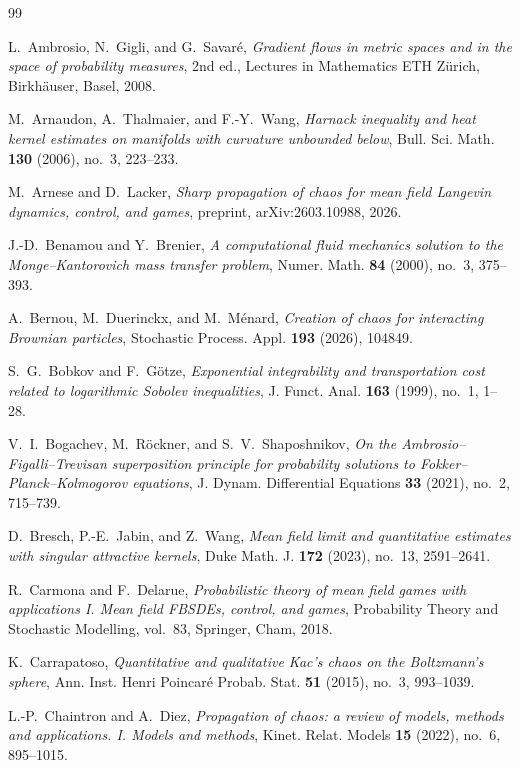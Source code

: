 \documentclass[11pt]{amsart}
\numberwithin{equation}{section}
\theoremstyle{plain}
\theoremstyle{remark}
\begin{document}
\begin{thebibliography}{99}

L.~Ambrosio, N.~Gigli, and G.~Savar\'e, \emph{Gradient flows in metric spaces and in the space of probability measures}, 2nd ed., Lectures in Mathematics ETH Z\"urich, Birkh\"auser, Basel, 2008.

M.~Arnaudon, A.~Thalmaier, and F.-Y.~Wang, \emph{Harnack inequality and heat kernel estimates on manifolds with curvature unbounded below}, Bull. Sci. Math. \textbf{130} (2006), no.~3, 223--233.

M.~Arnese and D.~Lacker, \emph{Sharp propagation of chaos for mean field Langevin dynamics, control, and games}, preprint, arXiv:2603.10988, 2026.

J.-D.~Benamou and Y.~Brenier, \emph{A computational fluid mechanics solution to the Monge--Kantorovich mass transfer problem}, Numer. Math. \textbf{84} (2000), no.~3, 375--393.

A.~Bernou, M.~Duerinckx, and M.~M\'enard, \emph{Creation of chaos for interacting Brownian particles}, Stochastic Process. Appl. \textbf{193} (2026), 104849.

S.~G.~Bobkov and F.~G\"otze, \emph{Exponential integrability and transportation cost related to logarithmic Sobolev inequalities}, J. Funct. Anal. \textbf{163} (1999), no.~1, 1--28.

V.~I.~Bogachev, M.~R\"ockner, and S.~V.~Shaposhnikov, \emph{On the Ambrosio--Figalli--Trevisan superposition principle for probability solutions to Fokker--Planck--Kolmogorov equations}, J. Dynam. Differential Equations \textbf{33} (2021), no.~2, 715--739.

D.~Bresch, P.-E.~Jabin, and Z.~Wang, \emph{Mean field limit and quantitative estimates with singular attractive kernels}, Duke Math. J. \textbf{172} (2023), no.~13, 2591--2641.

R.~Carmona and F.~Delarue, \emph{Probabilistic theory of mean field games with applications I. Mean field FBSDEs, control, and games}, Probability Theory and Stochastic Modelling, vol.~83, Springer, Cham, 2018.

K.~Carrapatoso, \emph{Quantitative and qualitative Kac's chaos on the Boltzmann's sphere}, Ann. Inst. Henri Poincar\'e Probab. Stat. \textbf{51} (2015), no.~3, 993--1039.

L.-P.~Chaintron and A.~Diez, \emph{Propagation of chaos: a review of models, methods and applications. I. Models and methods}, Kinet. Relat. Models \textbf{15} (2022), no.~6, 895--1015.


\end{thebibliography}
\end{document}
